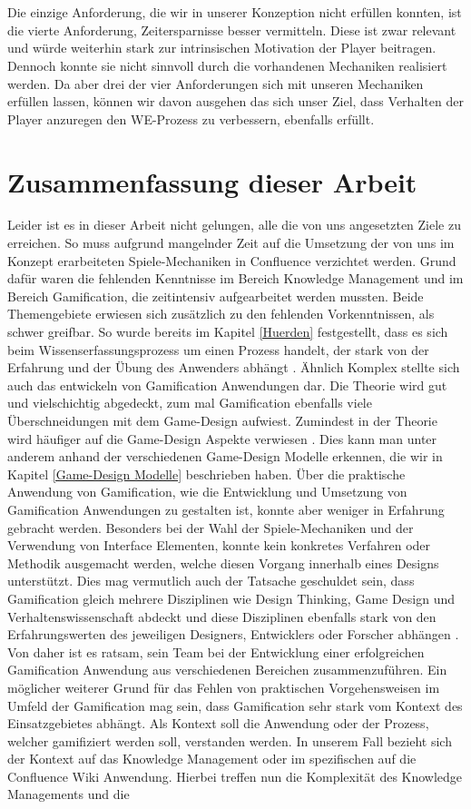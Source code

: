 \documentclass[a4paper,12pt,twoside]{scrartcl}
\begin{document}
\\\\
Die einzige Anforderung, die wir in unserer Konzeption nicht erfüllen konnten, ist die vierte Anforderung, Zeitersparnisse besser vermitteln. Diese ist zwar relevant und würde weiterhin stark zur intrinsischen Motivation der Player beitragen. Dennoch konnte sie nicht sinnvoll durch die vorhandenen Mechaniken realisiert werden. Da aber drei der vier Anforderungen sich mit unseren Mechaniken erfüllen lassen, können wir davon ausgehen das sich unser Ziel, dass Verhalten der Player anzuregen den WE-Prozess zu verbessern, ebenfalls erfüllt.
\newpage
\section{Zusammenfassung dieser Arbeit}
Leider ist es in dieser Arbeit nicht gelungen, alle die von uns angesetzten Ziele zu erreichen. So muss aufgrund mangelnder Zeit auf die Umsetzung der von uns im Konzept erarbeiteten Spiele-Mechaniken in Confluence verzichtet werden. Grund dafür waren die fehlenden Kenntnisse im Bereich Knowledge Management und im Bereich Gamification, die zeitintensiv aufgearbeitet werden mussten. Beide Themengebiete erwiesen sich zusätzlich zu den fehlenden Vorkenntnissen, als schwer greifbar. So wurde bereits im Kapitel \ref{Huerden} festgestellt, dass es sich beim Wissenserfassungsprozess um einen Prozess handelt, der stark von der Erfahrung und der Übung des Anwenders abhängt \cite{At2005}. Ähnlich Komplex stellte sich auch das entwickeln von Gamification Anwendungen dar. Die Theorie wird gut und vielschichtig abgedeckt, zum mal Gamification ebenfalls viele Überschneidungen mit dem Game-Design aufwiest. Zumindest in der Theorie wird häufiger auf die Game-Design Aspekte verwiesen \cite{Deterding2011}. Dies kann man unter anderem anhand der verschiedenen Game-Design Modelle erkennen, die wir in Kapitel \ref{Game-Design Modelle} beschrieben haben. Über die praktische Anwendung von Gamification, wie die Entwicklung und Umsetzung von Gamification Anwendungen zu gestalten ist, konnte aber weniger in Erfahrung gebracht werden. Besonders bei der Wahl der Spiele-Mechaniken und der Verwendung von Interface Elementen, konnte kein konkretes Verfahren oder Methodik ausgemacht werden, welche diesen Vorgang innerhalb eines Designs unterstützt. Dies mag vermutlich auch der Tatsache geschuldet sein, dass Gamification gleich mehrere Disziplinen wie Design Thinking, Game Design und Verhaltenswissenschaft abdeckt und diese Disziplinen ebenfalls stark von den Erfahrungswerten des jeweiligen Designers, Entwicklers oder Forscher abhängen \cite{gamificationDefinition}. Von daher ist es ratsam, sein Team bei der Entwicklung einer erfolgreichen Gamification Anwendung aus verschiedenen Bereichen zusammenzuführen. Ein möglicher weiterer Grund für das Fehlen von praktischen Vorgehensweisen im Umfeld der Gamification mag sein, dass Gamification sehr stark vom Kontext des Einsatzgebietes abhängt. Als Kontext soll die Anwendung oder der Prozess, welcher gamifiziert werden soll, verstanden werden. In unserem Fall bezieht sich der Kontext auf das Knowledge Management oder im spezifischen auf die Confluence Wiki Anwendung. Hierbei treffen nun die Komplexität des Knowledge Managements und die 
\end{document}
